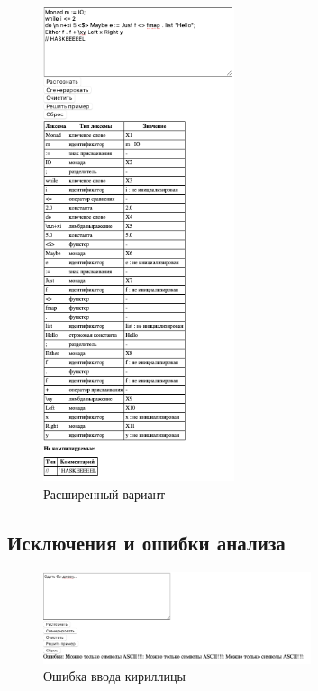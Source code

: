 \documentclass[areasetadvanced]{scrartcl}
\begin{document}
\begin{figure}[H]
    \centering
    \includegraphics[width=0.5\textwidth]{Large.png}
    \caption{Расширенный вариант}
    \label{fig:syntdiag}
\end{figure}

\subsection{Исключения и ошибки анализа}

\begin{figure}[H]
    \centering
    \includegraphics[width=0.7\textwidth]{OnlyASCII.png}
    \caption{Ошибка ввода кириллицы}
    \label{fig:syntdiag}
\end{figure}
\end{document}
